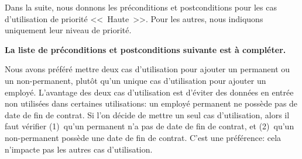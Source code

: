 \documentclass[11pt,article]{article}
\newcommand{\haute}{Haute}
\begin{document}
\bigskip

Dans la suite, nous donnons les préconditions et postconditions pour
les cas d'utilisation de priorité <<~\haute~>>. Pour les autres, nous
indiquons uniquement leur niveau de priorité.

\bigskip

{\color{red}\textbf{La liste de préconditions et postconditions
    suivante est à compléter.}}

\bigskip

Nous avons préféré mettre deux cas d'utilisation pour ajouter un
permanent ou un non-permanent, plutôt qu'un unique cas d'utilisation
pour ajouter un employé. L'avantage des deux cas d'utilisation est
d'éviter des données en entrée non utilisées dans certaines
utilisations: un employé permanent ne possède pas de date de fin de
contrat. Si l'on décide de mettre un seul cas d'utilisation, alors il
faut vérifier (1)~qu'un permanent n'a pas de date de fin de contrat,
et (2)~qu'un non-permanent possède une date de fin de contrat. C'est
une préférence: cela n'impacte pas les autres cas d'utilisation.

\bigskip
\end{document}
